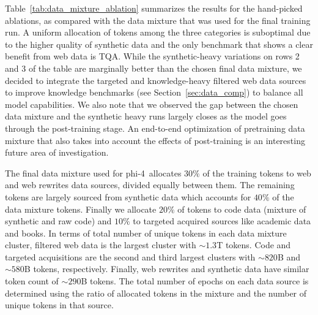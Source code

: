 \documentclass[11pt]{article}
\newcommand{\modelwithoutspace}{\textsf{phi-4}}
\newcommand{\model}{\modelwithoutspace~}
\begin{document}
Table~\ref{tab:data_mixture_ablation} summarizes the results for the hand-picked ablations, as compared with the data mixture that was used for the final training run. A uniform allocation of tokens among the three categories is suboptimal due to the higher quality of synthetic data and the only benchmark that shows a clear benefit from web data is TQA. While the synthetic-heavy variations on rows 2 and 3 of the table are marginally better than the chosen final data mixture, we decided to integrate the targeted and knowledge-heavy filtered web data sources to improve knowledge benchmarks (see Section~\ref{sec:data_comp}) to balance all model capabilities. We also note that we observed the gap between the chosen data mixture and the synthetic heavy runs largely closes as the model goes through the post-training stage. An end-to-end optimization of pretraining data mixture that also takes into account the effects of post-training is an interesting future area of investigation.


\begin{table}[ht]
\centering
{}
\caption{Data mixture for pretraining.}
\end{table}

The final data mixture used for \model allocates $30\%$ of the training tokens to web and web rewrites data sources, divided equally between them. The remaining tokens are largely sourced from synthetic data which accounts for $40\%$ of the data mixture tokens. Finally we allocate $20\%$ of tokens to code data (mixture of synthetic and raw code) and $10\%$ to targeted acquired sources like academic data and books. In terms of total number of unique tokens in each data mixture cluster, filtered web data is the largest cluster with $\sim1.3$T tokens. Code and targeted acquisitions are the second and third largest clusters with $\sim820$B and $\sim580$B tokens, respectively. Finally, web rewrites and synthetic data have similar token count of $\sim290$B tokens. The total number of epochs on each data source is determined using the ratio of allocated tokens in the mixture and the number of unique tokens in that source.
\end{document}

